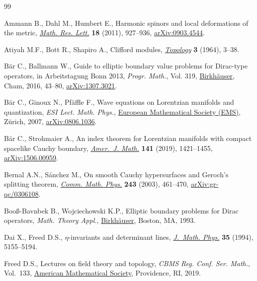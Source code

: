 \documentclass[pdftex]{sigma}
\numberwithin{equation}{section}
\begin{document}
\begin{thebibliography}{99}
\footnotesize\itemsep=0pt

Ammann B., Dahl M., Humbert E., Harmonic spinors and local deformations of the
 metric, \href{https://doi.org/10.4310/MRL.2011.v18.n5.a10}{\textit{Math. Res. Lett.}} \textbf{18} (2011), 927--936,
 \href{https://arxiv.org/abs/0903.4544}{arXiv:0903.4544}.

Atiyah M.F., Bott R., Shapiro A., Clifford modules, \href{https://doi.org/10.1016/0040-9383(64)90003-5}{\textit{Topology}}
 \textbf{3} (1964), 3--38.

B\"ar C., Ballmann W., Guide to elliptic boundary value problems for
 {D}irac-type operators, in Arbeitstagung {B}onn 2013, \textit{Progr. Math.},
 Vol. 319, \href{https://doi.org/10.1007/978-3-319-43648-7_3}{Birkh\"auser}, Cham, 2016, 43--80, \href{https://arxiv.org/abs/1307.3021}{arXiv:1307.3021}.

B\"ar C., Ginoux N., Pf\"affle F., Wave equations on {L}orentzian manifolds and
 quantization, \textit{ESI Lect. Math. Phys.}, \href{https://doi.org/10.4171/037}{European Mathematical Society (EMS)},
 Z\"urich, 2007, \href{https://arxiv.org/abs/0806.1036}{arXiv:0806.1036}.

B\"ar C., Strohmaier A., An index theorem for {L}orentzian manifolds with
 compact spacelike {C}auchy boundary, \href{https://doi.org/10.1353/ajm.2019.0037}{\textit{Amer.~J. Math.}} \textbf{141}
 (2019), 1421--1455, \href{https://arxiv.org/abs/1506.00959}{arXiv:1506.00959}.

Bernal A.N., S\'anchez M., On smooth {C}auchy hypersurfaces and {G}eroch's
 splitting theorem, \href{https://doi.org/10.1007/s00220-003-0982-6}{\textit{Comm. Math. Phys.}} \textbf{243} (2003), 461--470,
 \href{https://arxiv.org/abs/gr-qc/0306108}{arXiv:gr-qc/0306108}.

Boo{\ss}-Bavnbek B., Wojciechowski K.P., Elliptic boundary problems for {D}irac
 operators, \textit{Math. Theory Appl.}, \href{https://doi.org/10.1007/978-1-4612-0337-7}{Birkh\"auser}, Boston, MA, 1993.

Dai X., Freed D.S., {$\eta$}-invariants and determinant lines, \href{https://doi.org/10.1063/1.530747}{\textit{J.~Math. Phys.}} \textbf{35} (1994),
 5155--5194.

Freed D.S., Lectures on field theory and topology, \textit{CBMS Reg. Conf. Ser.
 Math.}, Vol.~133, \href{https://doi.org/10.1090/cbms/133}{American Mathematical Society}, Providence, RI, 2019.


\end{thebibliography}
\end{document}
